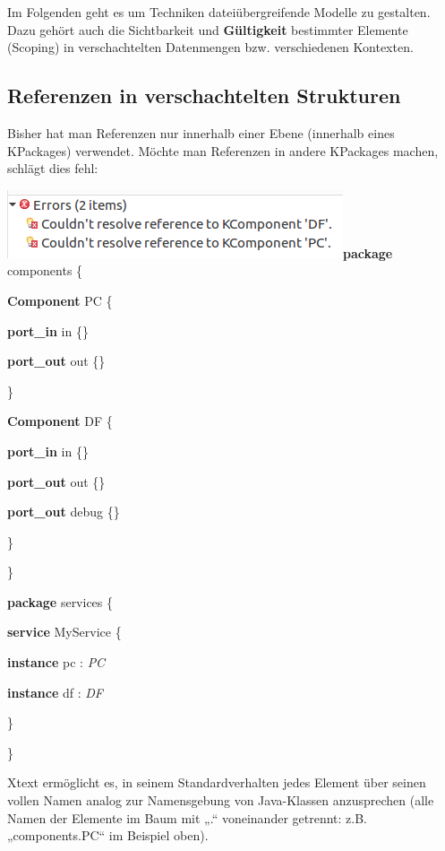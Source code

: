 \documentclass[a4]{article}
\begin{document}
Im Folgenden geht es um Techniken dateiübergreifende Modelle zu
gestalten. Dazu gehört auch die Sichtbarkeit und \textbf{Gültigkeit
}bestimmter Elemente (Scoping) in verschachtelten Datenmengen bzw.
verschiedenen Kontexten.

\subsection[Referenzen in verschachtelten
Strukturen]{\texorpdfstring{\protect\hypertarget{anchor-43}{}{}\protect\hypertarget{anchor-44}{}{}Referenzen
in verschachtelten
Strukturen}{Referenzen in verschachtelten Strukturen}}\label{referenzen-in-verschachtelten-strukturen}

Bisher hat man Referenzen nur innerhalb einer Ebene (innerhalb eines
KPackages) verwendet. Möchte man Referenzen in andere KPackages machen,
schlägt dies fehl:

\includegraphics[width=3.90630in,height=0.79170in]{./Pictures/10000201000001770000004CA84119E1BC561581.png}\textbf{package}
components \{

\textbf{Component} PC \{

\textbf{port\_in} in \{\}

\textbf{port\_out} out \{\}

\}

\textbf{Component} DF \{

\textbf{port\_in} in \{\}

\textbf{port\_out} out \{\}

\textbf{port\_out} debug \{\}

\}

\}

\textbf{package} services \{

\textbf{service} MyService \{

\textbf{instance} pc : \emph{PC}

\textbf{instance} df : \emph{DF}

\}

\}

Xtext ermöglicht es, in seinem Standardverhalten jedes Element über
seinen vollen Namen analog zur Namensgebung von Java-Klassen
anzusprechen (alle Namen der Elemente im Baum mit „.`` voneinander
getrennt: z.B. „components.PC`` im Beispiel oben).
\end{document}
